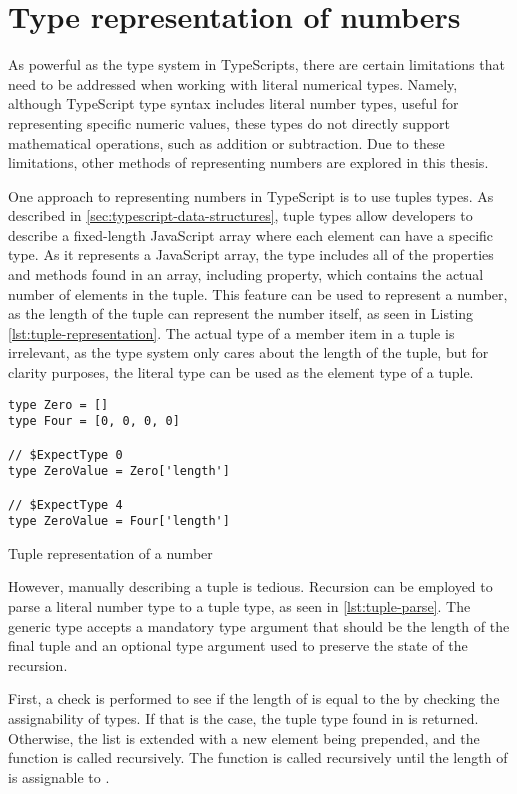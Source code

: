 \section{Type representation of numbers}

As powerful as the type system in TypeScripts, there are certain limitations that need to be addressed when working with literal numerical types. Namely, although TypeScript type syntax includes literal number types, useful for representing specific numeric values, these types do not directly support mathematical operations, such as addition or subtraction. Due to these limitations, other methods of representing numbers are explored in this thesis.

One approach to representing numbers in TypeScript is to use tuples types. As described in \ref{sec:typescript-data-structures}, tuple types allow developers to describe a fixed-length JavaScript array where each element can have a specific type. As it represents a JavaScript array, the type includes all of the properties and methods found in an array, including  property, which contains the actual number of elements in the tuple. This feature can be used to represent a number, as the length of the tuple can represent the number itself, as seen in Listing \ref{lst:tuple-representation}. The actual type of a member item in a tuple is irrelevant, as the type system only cares about the length of the tuple, but for clarity purposes, the literal type  can be used as the element type of a tuple.

\begin{listing}[ht]
  \begin{verbatim}
type Zero = []
type Four = [0, 0, 0, 0] 

// $ExpectType 0
type ZeroValue = Zero['length']

// $ExpectType 4
type ZeroValue = Four['length']
\end{verbatim}
  \caption{Tuple representation of a number}\label{lst:tuple-representation}
\end{listing}

However, manually describing a tuple is tedious. Recursion can be employed to parse a literal number type to a tuple type, as seen in \ref{lst:tuple-parse}. The  generic type accepts a mandatory type argument  that should be the length of the final tuple and an optional type argument  used to preserve the state of the recursion.

First, a check is performed to see if the length of  is equal to the  by checking the assignability of types. If that is the case, the tuple type found in  is returned. Otherwise, the list is extended with a new  element being prepended, and the function is called recursively. The function is called recursively until the length of  is assignable to .

